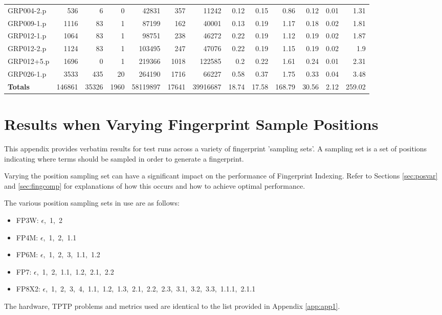 \begin{table}[H]
\begin{adjustwidth}{-0.4in}{-0.5in}
\begin{tabular}{| l || r | r | r || r | r | r || r | r | r | r | r | r |}
GRP004-2.p&536&6&0&42831&357&11242&0.12&0.15&0.86&0.12&0.01&1.31\\
GRP009-1.p&1116&83&1&87199&162&40001&0.13&0.19&1.17&0.18&0.02&1.81\\
GRP012-1.p&1064&83&1&98751&238&46272&0.22&0.19&1.12&0.19&0.02&1.87\\
GRP012-2.p&1124&83&1&103495&247&47076&0.22&0.19&1.15&0.19&0.02&1.9\\
GRP012+5.p&1696&0&1&219366&1018&122585&0.2&0.22&1.61&0.24&0.01&2.31\\
GRP026-1.p&3533&435&20&264190&1716&66227&0.58&0.37&1.75&0.33&0.04&3.48\\ \hline \hline
\textbf{Totals}&146861&35326&1960&58119897&17641&39916687&18.74&17.58&168.79&30.56&2.12&259.02\\\hline
\end{tabular}\end{adjustwidth}\end{table}


\chapter{Results when Varying Fingerprint Sample Positions}
\label{app:app2}

This appendix provides verbatim results for test runs across a variety of fingerprint
'sampling sets'. A sampling set is a set of positions indicating where terms should
be sampled in order to generate a fingerprint.

Varying the position sampling set can have a significant impact on the performance of Fingerprint
Indexing. Refer to Sections \ref{sec:posvar} and \ref{sec:fingcomp} for explanations
of how this occurs and how to achieve optimal performance.

The various position sampling sets in use are as follows:
\begin{itemize}
  \item FP3W:  $\epsilon$,\ 1,\ 2
  \item FP4M:  $\epsilon$,\ 1,\ 2,\ 1.1
  \item FP6M:  $\epsilon$,\ 1,\ 2,\ 3,\ 1.1,\ 1.2
  \item FP7:   $\epsilon$,\ 1,\ 2,\ 1.1,\ 1.2,\ 2.1,\ 2.2
  \item FP8X2: $\epsilon$,\ 1,\ 2,\ 3,\ 4,\ 1.1,\ 1.2,\ 1.3,\ 2.1,\ 2.2,\ 2.3,\ 3.1,\ 3.2,\ 3.3,\ 1.1.1,\ 2.1.1
\end{itemize}

The hardware, TPTP problems and metrics used are identical to the list provided in Appendix
\ref{app:app1}.

